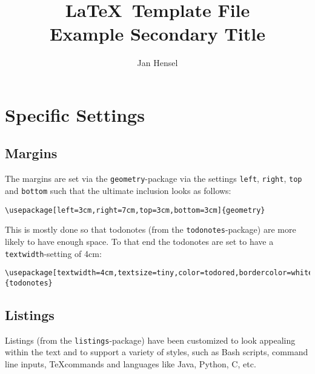 \documentclass{article}
\author{Jan Hensel}
\title{\textbf{\LaTeX\ Template File}\\
        Example Secondary Title}
\begin{document}
\maketitle

\section{Specific Settings}
    \subsection{Margins}
    The margins are set via the \texttt{geometry}-package via the settings
    \texttt{left}, \texttt{right}, \texttt{top} and \texttt{bottom} such that
    the ultimate inclusion looks as follows: 
    \begin{lstlisting}[style=latex]
        \usepackage[left=3cm,right=7cm,top=3cm,bottom=3cm]{geometry}
    \end{lstlisting}
    This is mostly done so that todonotes (from the \texttt{todonotes}-package)
    are more likely to have enough space. To that end the todonotes are set to
    have a \texttt{textwidth}-setting of 4cm: 
    \begin{lstlisting}[style=latex]
        \usepackage[textwidth=4cm,textsize=tiny,color=todored,bordercolor=white]{todonotes}
    \end{lstlisting}

    \subsection{Listings}
    Listings (from the \texttt{listings}-package) have been customized to look
    appealing within the text and to support a variety of styles, such as Bash
    scripts, command line inputs, \TeX commands and languages like Java,
    Python, C, etc. 
\end{document}
